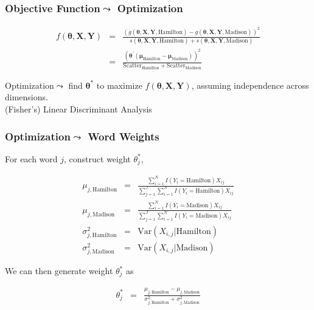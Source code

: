 \documentclass{beamer}
\numberwithin{equation}{section}
\begin{document}
\begin{frame}
\frametitle{Objective Function$\leadsto$ Optimization}

\begin{eqnarray}
f(\boldsymbol{\theta}, \boldsymbol{X}, \boldsymbol{Y} ) & = & \frac{\left(g(\boldsymbol{\theta}, \boldsymbol{X}, \boldsymbol{Y},  \text{Hamilton}) - g(\boldsymbol{\theta}, \boldsymbol{X}, \boldsymbol{Y},  \text{Madison}) \right)^2}{s(\boldsymbol{\theta}, \boldsymbol{X}, \boldsymbol{Y},  \text{Hamilton})  + s(\boldsymbol{\theta}, \boldsymbol{X}, \boldsymbol{Y},  \text{Madison}) } \nonumber\\
& =&  \frac{\left(\boldsymbol{\theta}^{'} ( \boldsymbol{\mu}_{\text{Hamilton}} - \boldsymbol{\mu}_{\text{Madison}})     \right)^2  }{\text{Scatter}_{\text{Hamilton}} + \text{Scatter}_{\text{Madison}}    } \nonumber 
\end{eqnarray}


\alert{Optimization}$\leadsto$ find $\boldsymbol{\theta}^{*}$ to maximize $f(\boldsymbol{\theta}, \boldsymbol{X}, \boldsymbol{Y} ) $, assuming independence across dimensions.\\

\alert{(Fisher's) Linear Discriminant Analysis}



\end{frame}





\begin{frame}
\frametitle{Optimization$\leadsto$ Word Weights}

For each word $j$, construct weight $\theta^{*}_{j}$, 
\begin{small}
\begin{eqnarray}
\mu_{j, \text{Hamilton}} & = & \frac{\sum_{i = 1}^{N} I(Y_{i} = \text{Hamilton}) X_{ij} }{\sum_{j=1}^{J} \sum_{i = 1}^{N} I(Y_{i} = \text{Hamilton}) X_{ij} } \nonumber \\
\mu_{j, \text{Madison}} & = & \frac{\sum_{i = 1}^{N} I(Y_{i} = \text{Madison}) X_{ij} }{\sum_{j=1}^{J} \sum_{i = 1}^{N} I(Y_{i} = \text{Madison}) X_{ij} } \nonumber \\
\sigma^{2}_{j, \text{Hamilton}} & = & \text{Var}(X_{i,j} |  \text{Hamilton}) \nonumber \\
\sigma^{2}_{j, \text{Madison} }& = & \text{Var}(X_{i,j} | \text{Madison}) \nonumber 
\end{eqnarray}
\end{small}


We can then generate weight $\theta^{*}_{j}$ as 

\begin{eqnarray}
\theta^{*}_j &= & \frac{\mu_{j, \text{Hamilton}}  - \mu_{j, \text{Madison}}  } {\sigma_{j, \text{Hamilton}}^{2} + \sigma_{j, \text{Madison}}^{2}    }  \nonumber 
\end{eqnarray}




\end{frame}
\end{document}

